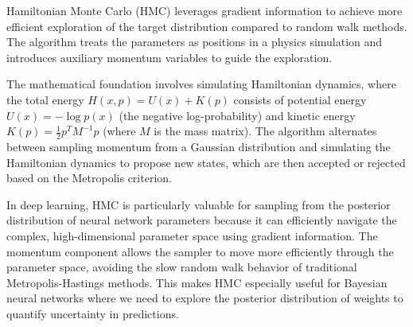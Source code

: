 Hamiltonian Monte Carlo (HMC) leverages gradient information to achieve more efficient exploration of the target distribution compared to random walk methods. The algorithm treats the parameters as positions in a physics simulation and introduces auxiliary momentum variables to guide the exploration.

The mathematical foundation involves simulating Hamiltonian dynamics, where the total energy $H(x, p) = U(x) + K(p)$ consists of potential energy $U(x) = -\log p(x)$ (the negative log-probability) and kinetic energy $K(p) = \frac{1}{2}p^T M^{-1} p$ (where $M$ is the mass matrix). The algorithm alternates between sampling momentum from a Gaussian distribution and simulating the Hamiltonian dynamics to propose new states, which are then accepted or rejected based on the Metropolis criterion.

In deep learning, HMC is particularly valuable for sampling from the posterior distribution of neural network parameters because it can efficiently navigate the complex, high-dimensional parameter space using gradient information. The momentum component allows the sampler to move more efficiently through the parameter space, avoiding the slow random walk behavior of traditional Metropolis-Hastings methods. This makes HMC especially useful for Bayesian neural networks where we need to explore the posterior distribution of weights to quantify uncertainty in predictions.






